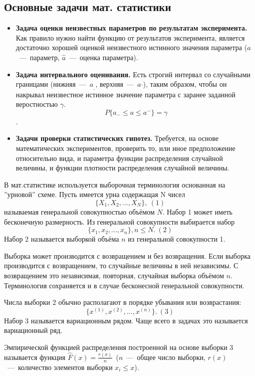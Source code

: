 \documentclass[12pt,a4paper,oneside]{extarticle}
\begin{document}
    \subsection{Основные задачи мат. статистики}
        \begin{itemize}
            \item {\bf Задача оценки неизвестных параметров по результатам эксперимента.}
            Как правило нужно найти функцию от результатов эксперимента, является достаточно хорошей оценкой неизвестного истинного значения параметра ($a$~---~параметр, $\hat{a}$~---~оценка параметра).

            \item {\bf Задача интервального оценивания.}
            Есть строгий интервал со случайными границами (нижняя~---~$a_{\_}$, верхняя~---~$a^{\_}$), таким образом, чтобы он накрывал неизвестное истинное значение параметра с заранее заданной веростностью $\gamma$.
            $$P\{a_{-} \leq a \leq a^{-}\}=\gamma$$.

            \item  {\bf Задачи проверки статистических гипотез.}
            Требуется, на основе математических экспериментов, проверить то, или иное предположение относительно вида, и параметра функции распределения случайной величины, и функции плотности распределения случайной величины.
        \end{itemize}

    В мат.статистике используется выборочная терминология основанная на ''урновой'' схеме.
    Пусть имеется урна содержащая N чисел $$\{X_1, X_2, ..., X_N\}, ~(1)$$ называемая генеральной совокупностью объёмом $N$. Набор 1 может иметь бесконечную размерность.
    Из генеральной совокупности выбирается набор $$\{x_1, x_2, ..., x_n\}, n \leq N. ~(2)$$
    Набор 2 называется выборкой объёма $n$ из генеральной совокупности 1.

    Выборка может производится с возвращением и без возвращения.
    Если выборка производится с возвращением, то случайные величины в ней независимы.
    С возвращением это независимая, повторная, случайная выборка объёмом $n$. Терминология сохраняется и в случае бесконесной генеральной совокупности.

    Числа выборки 2 обычно располагают в порядке убывания или возврастания: $$\{x^{(1)}, x^{(2)}, ..., x^{(n)}\}. ~(3)$$
    Набор 3 называется вариационным рядом. Чаще всего в задачах это называется вариационный ряд.

    Эмпирической функцией распределения построенной на основе выборки 3 называется функция $\hat{F}(x) = \frac{r(x)}{n}$~($n$~---~общее число выборки, $r(x)$~---~количество элементов выборки $x_i \leq x$).
\end{document}
